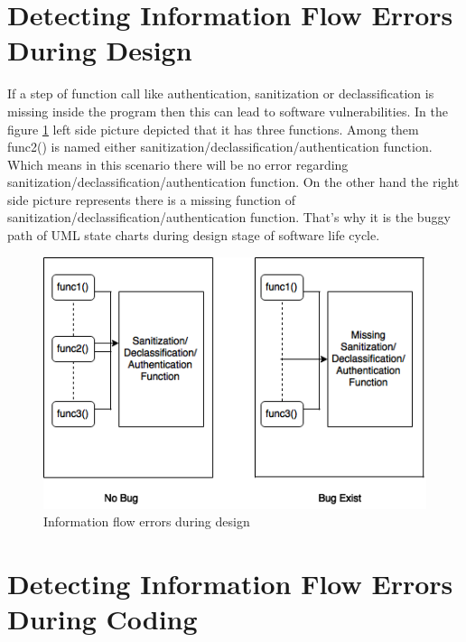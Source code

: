 \section{ Detecting Information Flow Errors During Design}
If a step of function call like authentication, sanitization or declassification is missing inside the program then this can lead to software vulnerabilities. In the figure \ref{figure_FunctionCallMissing} left side picture depicted that it has three functions. Among them func2() is named either sanitization/declassification/authentication function. Which means in this scenario there will be no error regarding sanitization/declassification/authentication function. On the other hand the right side picture represents there is a missing function of sanitization/declassification/authentication function. That's why it is the buggy path of UML state charts during design stage of software life cycle. 
\begin{figure}[htbp]
	\centering
	\includegraphics{styles/FunctionCallMissing.png}
	\caption{Information flow errors during design}
	\label{figure_FunctionCallMissing}
\end{figure}


\section{ Detecting Information Flow Errors During Coding}

